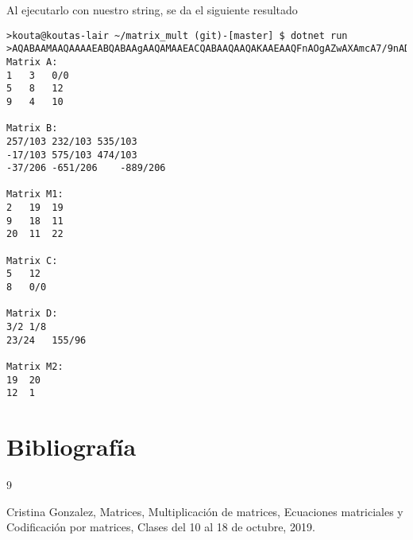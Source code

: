 \documentclass[11pt]{article}
\begin{document}
Al ejecutarlo con nuestro string, se da el siguiente resultado
\begin{lstlisting}
>kouta@koutas-lair ~/matrix_mult (git)-[master] $ dotnet run
>AQABAAMAAQAAAAEABQABAAgAAQAMAAEACQABAAQAAQAKAAEAAQFnAOgAZwAXAmcA7/9nAD8CZwDaAWcA2//OAHX9zgCH/M4ABQABAAwAAQAIAAEAAAABAAMAAgABAAgAFwAYAJsAYAA=
Matrix A:
1	3	0/0	
5	8	12	
9	4	10	

Matrix B:
257/103	232/103	535/103	
-17/103	575/103	474/103	
-37/206	-651/206	-889/206	

Matrix M1:
2	19	19	
9	18	11	
20	11	22	

Matrix C:
5	12	
8	0/0	

Matrix D:
3/2	1/8	
23/24	155/96	

Matrix M2:
19	20	
12	1	
\end{lstlisting}
\appendix
\section{Bibliografía}
\begin{thebibliography}{9}

  Cristina Gonzalez,
  Matrices, Multiplicación de matrices, Ecuaciones matriciales y Codificación por matrices,
  Clases del 10 al 18 de octubre,
  2019.
\end{thebibliography}
\end{document}
